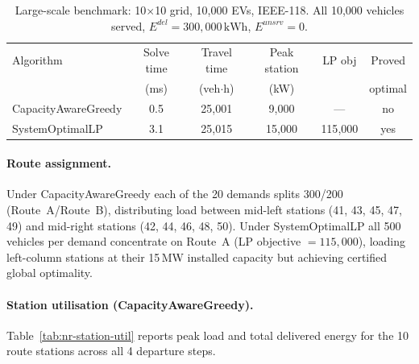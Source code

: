 \begin{table}[htbp]
\centering
\caption{Large-scale benchmark: 10$\times$10 grid, 10,000 EVs, IEEE-118.
  All 10,000 vehicles served, $E^{del} = 300{,}000\,\text{kWh}$,
  $E^{unsrv} = 0$.}
\label{tab:nr-largescale}
\begin{tabular}{lccccc}
\toprule
Algorithm & Solve time & Travel time & Peak station & LP obj & Proved \\
 & (ms) & (veh$\cdot$h) & (kW) & & optimal \\
\midrule
CapacityAwareGreedy & 0.5  & 25{,}001 & 9{,}000  & ---       & no  \\
SystemOptimalLP     & 3.1  & 25{,}015 & 15{,}000 & 115{,}000 & yes \\
\bottomrule
\end{tabular}
\end{table}

\paragraph{Route assignment.}
Under CapacityAwareGreedy each of the 20 demands splits 300/200
(Route~A/Route~B), distributing load between mid-left stations
(41, 43, 45, 47, 49) and mid-right stations (42, 44, 46, 48, 50).
Under SystemOptimalLP all 500 vehicles per demand concentrate on
Route~A (LP objective $= 115{,}000$), loading left-column stations
at their 15\,MW installed capacity but achieving certified global
optimality.

\paragraph{Station utilisation (CapacityAwareGreedy).}
Table~\ref{tab:nr-station-util} reports peak load and total delivered
energy for the 10 route stations across all 4 departure steps.

